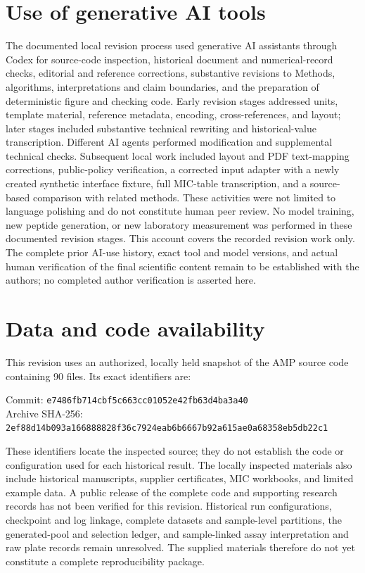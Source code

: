 \documentclass[journal]{IEEEtran}
\begin{document}
\section*{Use of generative AI tools}
The documented local revision process used generative AI assistants through Codex for source-code inspection, historical document and numerical-record checks, editorial and reference corrections, substantive revisions to Methods, algorithms, interpretations and claim boundaries, and the preparation of deterministic figure and checking code. Early revision stages addressed units, template material, reference metadata, encoding, cross-references, and layout; later stages included substantive technical rewriting and historical-value transcription. Different AI agents performed modification and supplemental technical checks. Subsequent local work included layout and PDF text-mapping corrections, public-policy verification, a corrected input adapter with a newly created synthetic interface fixture, full MIC-table transcription, and a source-based comparison with related methods. These activities were not limited to language polishing and do not constitute human peer review. No model training, new peptide generation, or new laboratory measurement was performed in these documented revision stages. This account covers the recorded revision work only. The complete prior AI-use history, exact tool and model versions, and actual human verification of the final scientific content remain to be established with the authors; no completed author verification is asserted here.

\section*{Data and code availability}
This revision uses an authorized, locally held snapshot of the AMP source code containing 90 files. Its exact identifiers are:
\begin{flushleft}
Commit: \texttt{e7486fb7}\allowbreak\texttt{14cbf5c6}\allowbreak\texttt{63cc0105}\allowbreak\texttt{2e42fb63}\allowbreak\texttt{d4ba3a40}\\
Archive SHA-256: \texttt{2ef88d14}\allowbreak\texttt{b093a166}\allowbreak\texttt{888828f3}\allowbreak\texttt{6c7924ea}\allowbreak\texttt{b6b6667b}\allowbreak\texttt{92a615ae}\allowbreak\texttt{0a68358e}\allowbreak\texttt{b5db22c1}
\end{flushleft}
These identifiers locate the inspected source; they do not establish the code or configuration used for each historical result. The locally inspected materials also include historical manuscripts, supplier certificates, MIC workbooks, and limited example data. A public release of the complete code and supporting research records has not been verified for this revision. Historical run configurations, checkpoint and log linkage, complete datasets and sample-level partitions, the generated-pool and selection ledger, and sample-linked assay interpretation and raw plate records remain unresolved. The supplied materials therefore do not yet constitute a complete reproducibility package.
\end{document}
